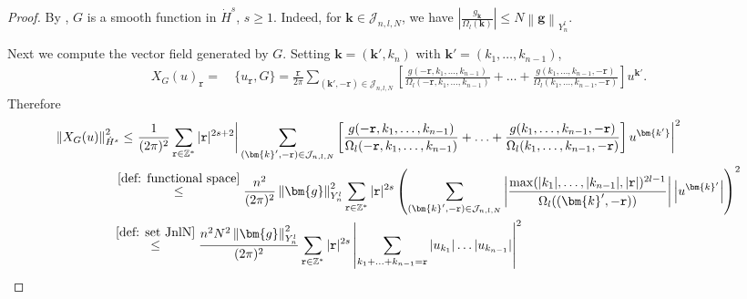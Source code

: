 \documentclass[a4paper,10pt,reqno]{article}
\theoremstyle{definition}
\theoremstyle{plain}
\theoremstyle{plain}
\theoremstyle{definition}
\theoremstyle{plain}
\theoremstyle{plain}
\theoremstyle{plain}
\theoremstyle{definition}
\theoremstyle{definition}
\newcommand{\norm}[1]{\left\lVert #1 \right\rVert}
\def \Z{\mathbb Z}
\def \J{\mathcal{J}}
\def \k{\bm{k}}
\def \tr{\mathtt{r}}
\begin{document}
\begin{proof}
By , $G$ is a smooth function in $\dot{H}^s$, $s \ge 1$. Indeed, for $\k \in \mathcal{J}_{n,l,N}$, we have 
$\left \lvert \frac{g_{\k}}{\Omega_l(\k)} \right \rvert \le N \norm{\bm{g}}_{Y_n^l}$. 

\medskip

 Next we compute the vector field generated by $G$. Setting $\k =(\k',k_{n})$ with $\k'=(k_1,\ldots,k_{n-1})$, 
\[
\begin{split}
X_G(u)_{\tr} =&\ \{ u_{\tr} , G \} = \frac{\tr}{2\pi} \sum_{(\k',-{\tr}) \in \mathcal{J}_{n,l,N}} \left [  \frac{g(-\tr,k_1,\ldots,k_{n-1})}{\Omega_l(-\tr,k_1,\ldots,k_{n-1})}+ \ldots + \frac{g(k_1,\ldots,k_{n-1},-\tr)}{\Omega_l(k_1,\ldots,k_{n-1},-\tr)} \right ] u^{\bm{k'}}.
\end{split}
\]
Therefore
\[
\begin{split}
\norm{X_G(u)}_{\dot{H}^s}^2 \le&\ \frac{1}{(2\pi)^2} \sum_{\tr \in \Z^*} |\tr|^{2s+2} \bigg \lvert \sum_{(\bm{k}',-\tr) \in \J_{n,l,N}} \left [  \frac{g(-\tr,k_1,\ldots,k_{n-1})}{\Omega_l(-\tr,k_1,\ldots,k_{n-1})}+\ldots + \frac{g(k_1,\ldots,k_{n-1},-\tr)}{\Omega_l(k_1,\ldots,k_{n-1},-\tr)} \right ] u^{\bm{k'}} \bigg \rvert^2 \\
 &\ \hspace{-0.65cm} \stackrel{\eqref{def: functional space}}{\le} \frac{n^2}{(2\pi)^2} \norm{\bm{g}}_{Y_n^l}^2 \sum_{\tr \in \Z^*} |\tr|^{2s} \left ( \sum_{(\bm{k}',-\tr) \in \J_{n,l,N}} \left \lvert \frac{\max(|k_1|,\ldots,|k_{n-1}|,|\tr|)^{2l-1}}{\Omega_l((\bm{k}',-\tr))} \right \rvert \left \lvert u^{\k'} \right \rvert  \right )^2 \\
 &\ \hspace{-0.7cm} \stackrel{\eqref{def: set JnlN}}{\le} \frac{n^2 N^2 \norm{\bm{g}}_{Y_n^l}^2}{(2\pi)^2} \sum_{\tr \in \Z^*} |\tr|^{2s} \left \lvert \sum_{k_1+\ldots+k_{n-1}=\tr} |u_{k_1}|\ldots|u_{k_{n-1}}|  \right \rvert^2\\

\end{split}\]
\end{proof}
\end{document}
